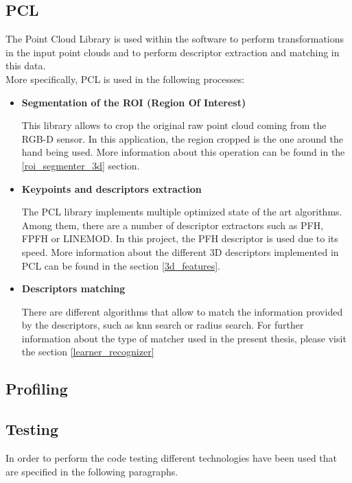 	\subsection{PCL}
		\label{technologies_pcl}
		The Point Cloud Library is used within the software to perform transformations in the input point clouds and to perform descriptor extraction and matching in this data. 
		\\

		More specifically, PCL is used in the following processes: 

		\begin{itemize}
			\item{\textbf{Segmentation of the ROI (Region Of Interest)\\ }}

			This library allows to crop the original raw point cloud coming from the RGB-D sensor. In this application, the region cropped is the one around the hand being used. More information about this operation can be found in the \ref{roi_segmenter_3d} section. 
			

			\item{\textbf{ Keypoints and descriptors extraction\\ }}

			 The PCL library implements multiple optimized state of the art algorithms. Among them, there are a number of descriptor extractors such as PFH, FPFH or LINEMOD. In this project, the PFH descriptor is used due to its speed. More information about the different 3D descriptors implemented in PCL can be found in the section \ref{3d_features}.


			\item {\textbf{Descriptors matching\\ }}

			There are different algorithms that allow to match the information provided by the descriptors, such as knn search or radius search. For further information about the type of matcher used in the present thesis, please visit the section \ref{learner_recognizer}
		\end{itemize}

	\subsection{Profiling}


	\subsection{Testing}
		\label{technologies_testing}
		In order to perform the code testing different technologies have been used that are specified in the following paragraphs. 
		\\


